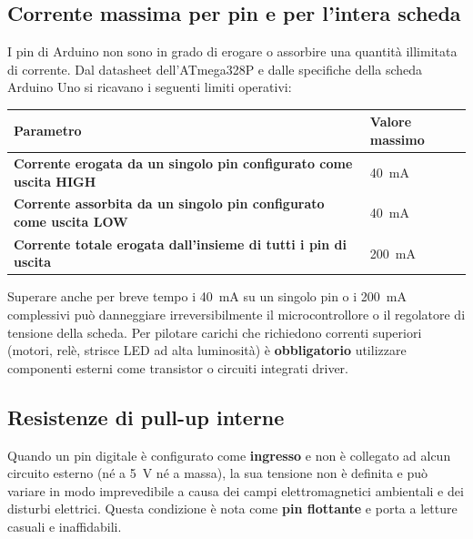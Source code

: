 \subsection*{Corrente massima per pin e per l'intera scheda}

I pin di Arduino non sono in grado di erogare o assorbire una quantità illimitata di corrente. Dal datasheet dell'ATmega328P e dalle specifiche della scheda Arduino Uno si ricavano i seguenti limiti operativi:

\begin{center}
\begin{tabular}{>{\bfseries}l l}
    \toprule
    Parametro & Valore massimo \\
    \midrule
    Corrente erogata da un singolo pin configurato come uscita HIGH & \SI{40}{\milli\ampere} \\
    Corrente assorbita da un singolo pin configurato come uscita LOW  & \SI{40}{\milli\ampere} \\
    Corrente totale erogata dall'insieme di tutti i pin di uscita     & \SI{200}{\milli\ampere} \\
    \bottomrule
\end{tabular}
\end{center}

\begin{tcolorbox}[colback=red!4, colframe=red!60, title=\textbf{Attenzione – Superamento dei limiti di corrente}]
    Superare anche per breve tempo i \SI{40}{\milli\ampere} su un singolo pin o i \SI{200}{\milli\ampere} complessivi può danneggiare irreversibilmente il microcontrollore o il regolatore di tensione della scheda. Per pilotare carichi che richiedono correnti superiori (motori, relè, strisce LED ad alta luminosità) è \textbf{obbligatorio} utilizzare componenti esterni come transistor o circuiti integrati driver.
\end{tcolorbox}

\subsection*{Resistenze di pull-up interne}

Quando un pin digitale è configurato come \textbf{ingresso} e non è collegato ad alcun circuito esterno (né a \SI{5}{\volt} né a massa), la sua tensione non è definita e può variare in modo imprevedibile a causa dei campi elettromagnetici ambientali e dei disturbi elettrici. Questa condizione è nota come \textbf{pin flottante} e porta a letture casuali e inaffidabili.

